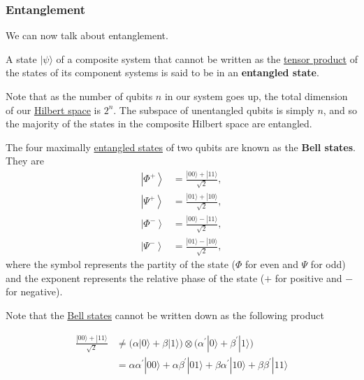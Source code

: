 \documentclass{article}
\newcommand{\ket}[1]{\ensuremath{\left|#1\right\rangle}}
\newcounter{definition}[section]
\begin{document}
    \subsubsection{Entanglement} 

      We can now talk about entanglement. 

      \begin{definition}
        \label{def:entangled-state}
        A state $|\psi\rangle$ of a composite system that cannot be written as the \hyperref[sm-def:tensor-product]{tensor product} of the states of its component systems is said to be in an \textbf{entangled state}.   
      \end{definition}

      Note that as the number of qubits $n$ in our system goes up, the total dimension of our \hyperref[fa-def:hilbert-space]{Hilbert space} is $2^n$. The subspace of unentangled qubits is simply $n$, and so the majority of the states in the composite Hilbert space are entangled. 

      \begin{definition}
        \label{def:bell-states}
        The four maximally \hyperref[def:entangled-state]{entangled states} of two qubits are known as the \textbf{Bell states}. They are
        \begin{align}
          \ket{\Phi^+} & = \frac{|00\rangle + |11\rangle}{\sqrt{2}}, \\
          \ket{\Psi^+} & = \frac{|01\rangle + |10\rangle}{\sqrt{2}}, \\
          \ket{\Phi^-} & = \frac{|00\rangle - |11\rangle}{\sqrt{2}}, \\
          \ket{\Psi^-} & = \frac{|01\rangle - |10\rangle}{\sqrt{2}},
        \end{align}
        where the symbol represents the partity of the state ($\Phi$ for even and $\Psi$ for odd) and the exponent represents the relative phase of the state ($+$ for positive and $-$ for negative). 
      \end{definition}

      Note that the \hyperref[def:bell-states]{Bell states} cannot be written down as the following product

      \begin{align*}
        \frac{|00\rangle + |11 \rangle}{\sqrt{2}} & \neq \big(\alpha |0\rangle + \beta |1\rangle \big) \otimes \big( \alpha^\prime |0 \rangle + \beta^\prime |1\rangle \big) \\
        & = \alpha \alpha^\prime |00\rangle + \alpha \beta^\prime |01\rangle + \beta \alpha^\prime |10\rangle + \beta \beta^\prime |11\rangle
      \end{align*}
\end{document}
